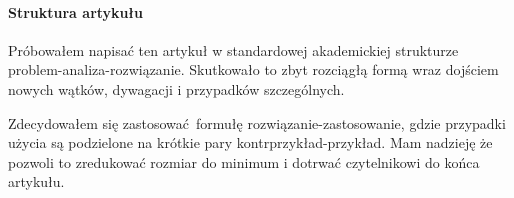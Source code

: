 \paragraph{Struktura artykułu}
Próbowałem napisać ten artykuł w standardowej akademickiej strukturze problem-analiza-rozwiązanie. Skutkowało to zbyt rozciągłą formą wraz dojściem nowych wątków, dywagacji i przypadków szczególnych.

Zdecydowałem się zastosować formułę rozwiązanie-zastosowanie, gdzie przypadki użycia są podzielone na krótkie pary kontrprzykład-przykład. Mam nadzieję że pozwoli to zredukować rozmiar do minimum i dotrwać czytelnikowi do końca artykułu.
